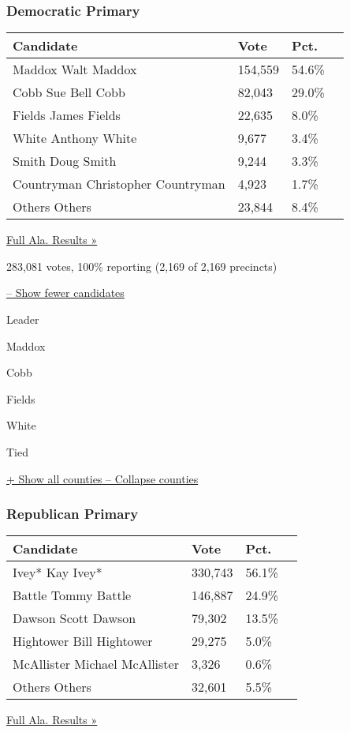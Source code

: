 \hypertarget{democratic-primary}{%
\subsubsection{Democratic Primary}\label{democratic-primary}}

\begin{longtable}[]{@{}llll@{}}
\toprule
Candidate & Vote & Pct. &\tabularnewline
\midrule
\endhead
 Maddox Walt Maddox & 154,559 & 54.6\% &\tabularnewline
 Cobb Sue Bell Cobb & 82,043 & 29.0\% &\tabularnewline
 Fields James Fields & 22,635 & 8.0\% &\tabularnewline
 White Anthony White & 9,677 & 3.4\% &\tabularnewline
 Smith Doug Smith & 9,244 & 3.3\% &\tabularnewline
 Countryman Christopher Countryman & 4,923 & 1.7\% &\tabularnewline
 Others Others & 23,844 & 8.4\% &\tabularnewline
\bottomrule
\end{longtable}

\href{https://www.nytimes3xbfgragh.onion/elections/results/alabama}{Full
Ala. Results »}

283,081 votes, 100\% reporting (2,169 of 2,169 precincts)

\protect\hyperlink{}{-- Show fewer candidates}

Leader

 Maddox

 Cobb

 Fields

 White

 Tied

\protect\hyperlink{}{+ Show all counties -- Collapse counties}

\hypertarget{republican-primary}{%
\subsubsection{Republican Primary}\label{republican-primary}}

\begin{longtable}[]{@{}llll@{}}
\toprule
Candidate & Vote & Pct. &\tabularnewline
\midrule
\endhead
 Ivey* Kay Ivey* & 330,743 & 56.1\% &\tabularnewline
 Battle Tommy Battle & 146,887 & 24.9\% &\tabularnewline
 Dawson Scott Dawson & 79,302 & 13.5\% &\tabularnewline
 Hightower Bill Hightower & 29,275 & 5.0\% &\tabularnewline
 McAllister Michael McAllister & 3,326 & 0.6\% &\tabularnewline
 Others Others & 32,601 & 5.5\% &\tabularnewline
\bottomrule
\end{longtable}

\href{https://www.nytimes3xbfgragh.onion/elections/results/alabama}{Full
Ala. Results »}

